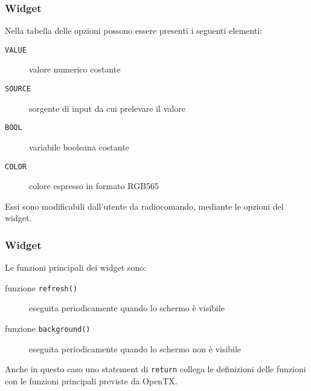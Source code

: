 \documentclass{beamer}
\begin{document}
\begin{frame}
        \frametitle{Widget}
        Nella tabella delle opzioni possono essere presenti i seguenti elementi:
        
        \begin{description}
                \item[\texttt{VALUE}] valore numerico costante
                        
                \item[\texttt{SOURCE}] sorgente di input da cui prelevare il valore
                        
                \item[\texttt{BOOL}] variabile booleana costante
                        
                \item[\texttt{COLOR}] colore espresso in formato RGB565
                        
        \end{description}
        Essi sono modificabili dall'utente da radiocomando, mediante le opzioni del widget.\newline
\end{frame}

\begin{frame}
        \frametitle{Widget}
        Le funzioni principali dei widget sono:
        
        \begin{description}
                \item[funzione \texttt{refresh()}] eseguita periodicamente quando lo schermo è visibile
                        
                \item[funzione \texttt{background()}] eseguita periodicamente quando lo schermo non è visibile
                        
        \end{description}
        Anche in questo caso uno statement di \texttt{return} collega le definizioni delle funzioni con le funzioni principali previste da OpenTX.
\end{frame}
\end{document}
